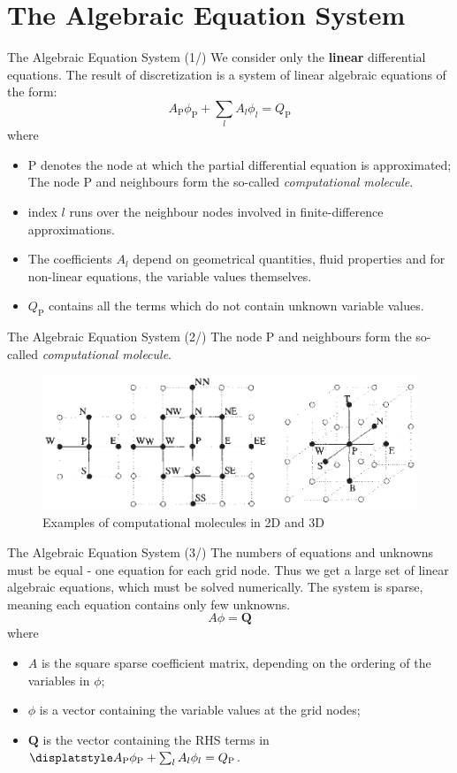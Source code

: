 \documentclass[10pt]{beamer}
\begin{document}
\section{The Algebraic Equation System}
\begin{frame}{The Algebraic Equation System (1/)}
We consider only the \textbf{linear} differential equations. The result of discretization is a system of linear algebraic equations of the form:
    \[ A_{\mathrm{P}}\phi_{\mathrm{P}}+\sum_{l}A_{l}\phi_{l} = Q_{\mathrm{P}} \]
where 
\begin{itemize}
    \item $\mathrm{P}$ denotes the node at which the partial differential equation is approximated; The node $\mathrm{P}$ and neighbours form the so-called \emph{computational molecule}.
    \item index $l$ runs over the neighbour nodes involved in finite-difference approximations.
    \item The coefficients $A_{l}$ depend on geometrical quantities, fluid properties and for non-linear equations, the variable values themselves.
    \item $Q_{\mathrm{P}}$ contains all the terms which do not contain unknown variable values. 
\end{itemize} 
\end{frame}
\begin{frame}{The Algebraic Equation System (2/)}
The node $\mathrm{P}$ and neighbours form the so-called \emph{computational molecule}.
\begin{figure}[H]
    \centering
    \includegraphics[width=.8\textwidth]{imgs/computational-molecules.eps}
    \caption{Examples of computational molecules in 2D and 3D}
    \label{fig:comp_mol}
\end{figure}
\end{frame}
\begin{frame}{The Algebraic Equation System (3/)}
The numbers of equations and unknowns must be equal - one equation for each grid node. Thus we get a large set of linear algebraic equations, which must be solved numerically. The system is sparse, meaning each equation contains only few unknowns. 
    \[A\phi = \mathbf{Q}\]
where 
\begin{itemize}
    \item $A$ is the square sparse coefficient matrix, depending on the ordering of the variables in $\phi$;
    \item $\phi$ is a vector containing the variable values at the grid nodes;
    \item $\mathbf{Q}$ is the vector containing the RHS terms in $\displatstyle A_{\mathrm{P}}\phi_{\mathrm{P}}+\sum_{l}A_{l}\phi_{l} = Q_{\mathrm{P}}$.
\end{itemize} 
\end{frame}
\end{document}
